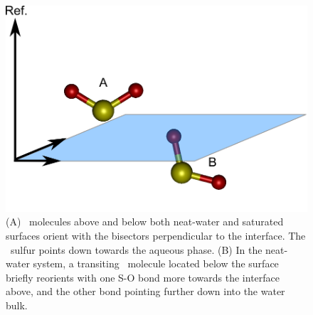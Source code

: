 \begin{figure}[h!]
	\begin{center}
		\includegraphics[scale=1.0]{images/angle-cartoons/so2-surface.png}
		\caption{(A) \suldiox~molecules above and below both neat-water and saturated surfaces orient with the bisectors perpendicular to the interface. The \suldiox~sulfur points down towards the aqueous phase. (B) In the neat-water system, a transiting \suldiox~molecule located below the surface briefly reorients with one S-O bond more towards the interface above, and the other bond pointing further down into the water bulk.}
		\label{fig:so2-surface-angles}
	\end{center}
\end{figure}


